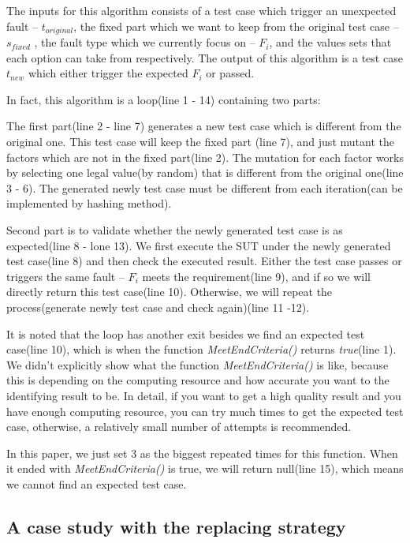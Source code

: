 \documentclass{sig-alternate}
\begin{document}
The inputs for this algorithm consists of a test case which trigger an unexpected fault -- $t_{original}$, the fixed part which we want to keep from the original test case -- $s_{fixed}$ , the fault type which we currently focus on -- $F_{i}$, and the values sets that each option can take from respectively.  The output of this algorithm is a test case $t_{new}$ which either trigger the expected $F_{i}$ or passed.

In fact, this algorithm is a loop(line 1 - 14) containing two parts:

The first part(line 2 - line 7) generates a new test case which is different from the original one. This test case will keep the fixed part (line 7), and just mutant the factors which are not in the fixed part(line 2). The mutation for each factor works by selecting one legal value(by random) that is different from the original one(line 3 - 6). The generated newly test case must be different from each iteration(can be implemented by hashing method).

Second part is to validate whether the newly generated test case is as expected(line 8 - lone 13). We first execute the SUT under the newly generated test case(line 8) and then check the executed result. Either the test case passes or triggers the same fault -- $F_{i}$ meets the requirement(line 9), and if so we will directly return this test case(line 10). Otherwise, we will repeat the process(generate newly test case and check again)(line 11 -12).

It is noted that the loop has another exit besides we find an expected test case(line 10), which is when the function \emph{MeetEndCriteria()} returns \emph{true}(line 1). We didn't explicitly show what the function \emph{MeetEndCriteria()} is like, because this is depending on the computing resource and how accurate you want to the identifying result to be. In detail, if you want to get a high quality result and you have enough computing resource, you can try much times to get the expected test case, otherwise, a relatively small number of attempts is recommended.

In this paper, we just set 3 as the biggest repeated times for this function. When it ended with \emph{MeetEndCriteria()} is true, we will return null(line 15), which means we cannot find an expected test case.

\subsection{A case study with the replacing strategy}
\end{document}
